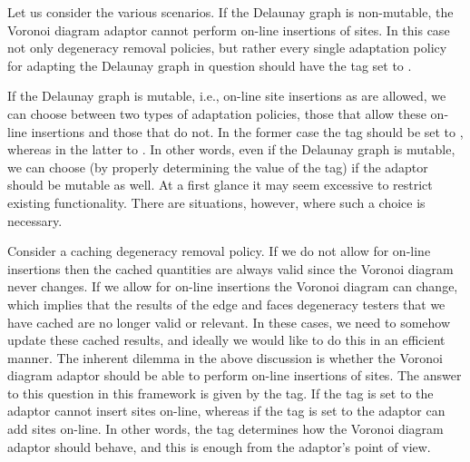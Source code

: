 Let us consider the various scenarios. If the Delaunay graph is
non-mutable, the Voronoi diagram adaptor cannot perform on-line
insertions of sites. In this case not only degeneracy removal
policies, but rather every single adaptation policy for
adapting the Delaunay graph in question should have the
 tag set to .

If the Delaunay graph is mutable, i.e., on-line site insertions as are
allowed, we can choose between two types of adaptation policies, those
that allow these on-line insertions and those that do not. In the
former case the  tag should be set to
, whereas in the latter to
. In other words, even if the Delaunay graph is
mutable, we can choose (by properly determining the value of the
 tag) if the adaptor should be mutable as well. At a
first glance it may seem excessive to restrict existing
functionality. There are situations, however, where such a choice is
necessary.

Consider a caching degeneracy removal policy. If we do not allow for
on-line insertions then the cached quantities are always valid since
the Voronoi diagram never changes. If we allow for on-line insertions
the Voronoi diagram can change, which implies that the results of the edge
and faces degeneracy testers that we have cached are no longer valid
or relevant. In these cases, we need to somehow update these cached
results, and ideally we would like to do this in an efficient manner.
%
The inherent dilemma in the above discussion is whether the Voronoi
diagram adaptor should be able to perform on-line insertions of
sites. The answer to this question in this framework is given by the
 tag. If the tag is set to  the
adaptor cannot insert sites on-line, whereas if the tag is set to
 the adaptor can add sites on-line. In other
words, the  tag determines how the Voronoi diagram
adaptor should behave, and this is enough from the adaptor's point of
view.

